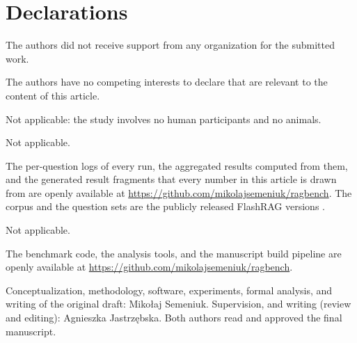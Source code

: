 \backmatter

\section*{Declarations}

The authors did not receive support from any organization for the
submitted work.

The authors have no competing interests to declare that are relevant to
the content of this article.

Not applicable: the study involves no human participants and no animals.

Not applicable.

The per-question logs of every run, the aggregated results computed from
them, and the generated result fragments that every number in this
article is drawn from are openly available at
\url{https://github.com/mikolajsemeniuk/ragbench}. The corpus and the
question sets are the publicly released FlashRAG versions
\citep{jin2024flashrag}.

Not applicable.

The benchmark code, the analysis tools, and the manuscript build pipeline
are openly available at \url{https://github.com/mikolajsemeniuk/ragbench}.

Conceptualization, methodology, software, experiments, formal analysis,
and writing of the original draft: Miko{\l}aj Semeniuk. Supervision, and
writing (review and editing): Agnieszka Jastrz{\k{e}}bska. Both authors read
and approved the final manuscript.

\begin{appendices}

\end{appendices}




